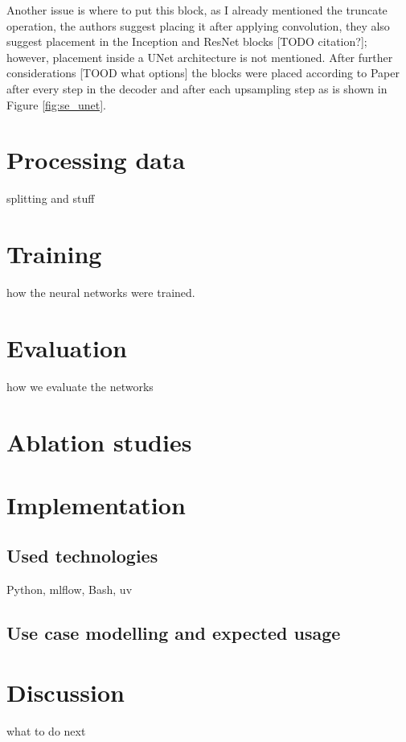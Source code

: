 \documentclass[
  digital,     %
  oneside,     %
  nosansbold,  %
  nocolorbold, %
  lof,         %
  lot,         %
]{fithesis4}
\begin{document}
Another issue is where to put this block, as I already mentioned the truncate
operation, the authors suggest placing it after applying convolution, they also
suggest placement in the Inception and ResNet blocks [TODO citation?]; however,
placement inside a UNet architecture is not mentioned. After further
considerations [TOOD what options] the blocks were placed according to Paper
\parencite{Rundo2019} after every step in the decoder and after each upsampling
step as is shown in Figure \ref{fig:se_unet}.

\chapter{Processing data}
splitting and stuff

\chapter{Training}
how the neural networks were trained.

\chapter{Evaluation}
how we evaluate the networks

\chapter{Ablation studies}

\chapter{Implementation}

\section{Used technologies}
Python, mlflow, Bash, uv

\section{Use case modelling and expected usage}

\chapter{Discussion}
what to do next
\end{document}
